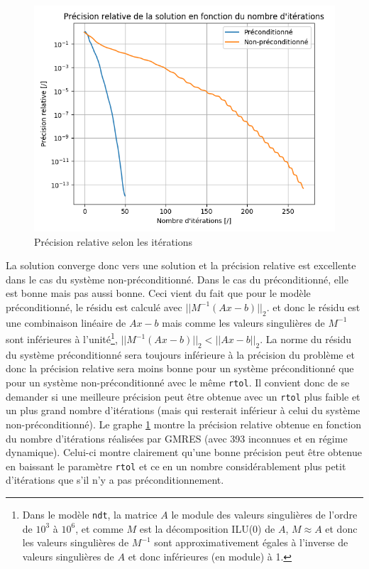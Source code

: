 \documentclass[11pt]{article}
\begin{document}
\begin{figure}
\vspace{-8pt}
    \includegraphics[width=\linewidth]{preciter.png}
    \caption{Précision relative selon les itérations}
    \label{preciter}
\end{figure}
La solution converge donc vers une solution et la précision relative est excellente dans le cas du système non-préconditionné. Dans le cas du préconditionné, elle est bonne mais pas aussi bonne. Ceci vient du fait que pour le modèle préconditionné, le résidu est calculé avec $||M^{-1}(Ax-b)||_2$. et donc le résidu est une combinaison linéaire de $Ax-b$ mais comme les valeurs singulières de $M^{-1}$ sont inférieures à l'unité\footnote{Dans le modèle \texttt{ndt}, la matrice $A$ le module des valeurs singulières de l'ordre de $10^3$ à $10^6$, et comme $M$ est la décomposition ILU(0) de $A$, $M \approx A$ et donc les valeurs singulières de $M^{-1}$ sont approximativement égales à l'inverse de valeurs singulières de $A$ et donc inférieures (en module) à 1.}, $||M^{-1}(Ax-b)||_2 < ||Ax-b||_2$. La norme du résidu du système préconditionné sera toujours inférieure à la précision du problème et donc la précision relative sera moins bonne pour un système préconditionné que pour un système non-préconditionné avec le même \texttt{rtol}.  Il convient donc de se demander si une meilleure précision peut être obtenue avec un \texttt{rtol} plus faible et un plus grand nombre d'itérations (mais qui resterait inférieur à celui du système non-préconditionné). Le graphe \ref{preciter} montre la précision relative obtenue en fonction du nombre d'itérations réalisées par GMRES (avec 393 inconnues et en régime dynamique). Celui-ci montre clairement qu'une bonne précision peut être obtenue en baissant le paramètre \texttt{rtol} et ce en un nombre considérablement plus petit d'itérations que s'il n'y a pas préconditionnement. \\
\vspace{-8pt}
\end{document}
